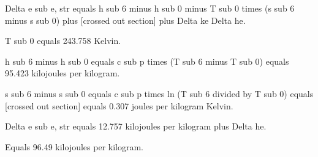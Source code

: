 Delta e sub e, str equals h sub 6 minus h sub 0 minus T sub 0 times (s sub 6 minus s sub 0) plus [crossed out section] plus Delta ke Delta he.  

T sub 0 equals 243.758 Kelvin.  

h sub 6 minus h sub 0 equals c sub p times (T sub 6 minus T sub 0) equals 95.423 kilojoules per kilogram.  

s sub 6 minus s sub 0 equals c sub p times ln (T sub 6 divided by T sub 0) equals [crossed out section] equals 0.307 joules per kilogram Kelvin.  

Delta e sub e, str equals 12.757 kilojoules per kilogram plus Delta he.  

Equals 96.49 kilojoules per kilogram.